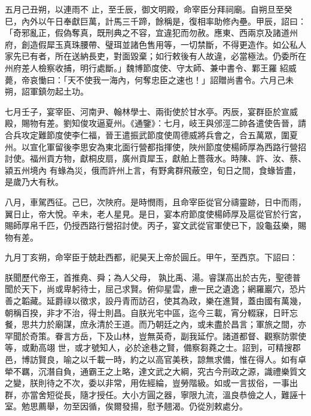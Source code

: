 \begin{pinyinscope}
 五月己丑朔，以連雨不
 止，至壬辰，御文明殿，命宰臣分拜祠廟。自朔旦至癸巳，內外以午日奉獻巨萬，計馬三千蹄，餘稱是，復相率助修內壘。甲辰，詔曰：「奇邪亂正，假偽奪真，既刑典之不容，宜違犯而勿赦。應東、西兩京及諸道州府，創造假犀玉真珠腰帶、璧珥並諸色售用等，一切禁斷，不得更造作。如公私人家先已有者，所在送納長吏，對面毀棄；如行敕後有人故違，必當極法。仍委所在州府差人檢察收捕，明行處斷。」魏博節度使、守太師、兼中書令、鄴王羅
 紹威薨，帝哀慟曰：「天不使我一海內，何奪忠臣之速也！」詔贈尚書令。六月己未朔，詔軍鎮勿起土功。



 七月壬子，宴宰臣、河南尹、翰林學士、兩街使於甘水亭。丙辰，宴群臣於宣威殿，賜物有差。劉知俊攻逼夏州。《通鑒》：七月，岐王與邠涇二帥各遣使告晉，請合兵攻定難節度使李仁福，晉王遣振武節度使周德威將兵會之，合五萬眾，圍夏州。以宣化軍留後李思安為東北面行營都指揮使，陜州節度使楊師厚為西路行營招討使。福州貢方物，獻桐皮扇，廣州貢犀玉，獻舶上薔薇水。時陳、許、汝、蔡、潁五州境內
 有蝝為災，俄而許州上言，有野禽群飛蔽空，旬日之間，食蝝皆盡，是歲乃大有秋。



 八月，車駕西征。己巳，次陜府。是時憫雨，且命宰臣從官分禱靈跡，日中而雨，翼日止，帝大悅。辛未，老人星見。是日，宴本府節度使楊師厚及扈從官於行宮，賜師厚帛千匹，仍授西路行營招討使。丙子，宴文武從官軍使已下，設龜茲樂，賜物有差。



 九月丁亥朔，命宰臣于兢赴西都，祀昊天上帝於圓丘。甲午，至西京。下詔曰：



 朕聞歷代帝王，首推堯、舜；為人父母，
 孰比禹、湯。睿謀高出於古先，聖德普聞於天下，尚或卑躬待士，屈己求賢。俯仰星雲，慮一民之遺逸；網羅巖穴，恐片善之韜藏。延爵祿以徵求，設丹青而訪召，使其為政，樂在進賢，蓋由國有萬幾，朝稱百揆，非才不治，得士則昌。自朕光宅中區，迄今三載，宵分輟寐，日旰忘餐，思共力於廟謀，庶永清於王道。而乃朝廷之內，或未盡於昌言；軍旅之間，亦罕聞於奇策。眷言方岳，下及山林，豈無英奇，副我延佇。諸道都督、觀察防禦使等，或勳高翊
 世，或才號知人，必於途巷之賢，備察芻蕘之士。詔到，可精搜郡邑，博訪賢良，喻之以千載一時，約之以高官美秩，諒無求備，惟在得人。如有卓犖不羈，沉潛自負，通霸王之上略，達文武之大綱，究古今刑政之源，識禮樂質文之變，朕則待之不次，委以非常，用佐經綸，豈勞階級。如或一言拔俗，一事出群，亦當舍短從長，隨才授任。大小方圓之器，寧限九流，溫良恭儉之人，難誣十室。勉思薦舉，勿至因循，俟爾發揚，慰予翹渴。仍從別敕處分。




\end{pinyinscope}
